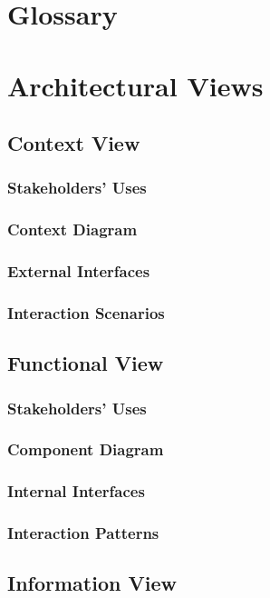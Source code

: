 \documentclass[a4paper]{article}
\begin{document}
    \section{Glossary}
    \lipsum[1-1]

    \section{Architectural Views}
    \subsection{Context View}
    \subsubsection{Stakeholders' Uses}
    \lipsum[1-1]
    \subsubsection{Context Diagram}
    \lipsum[1-1]
    \subsubsection{External Interfaces}
    \lipsum[1-1]
    \subsubsection{Interaction Scenarios}
    \lipsum[1-1]
    \subsection{Functional View}
    \subsubsection{Stakeholders' Uses}
    \lipsum[1-1]
    \subsubsection{Component Diagram}
    \subsubsection{Internal Interfaces}
    \lipsum[1-1]
    \subsubsection{Interaction Patterns}
    \lipsum[1-1]
    \subsection{Information View}
\end{document}

